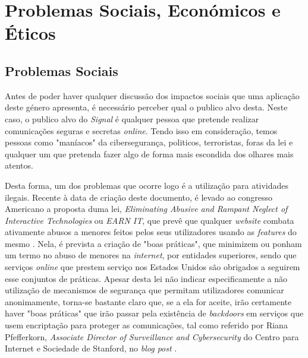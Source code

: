 \section{Problemas Sociais, Económicos e Éticos}

\subsection{Problemas Sociais}
Antes de poder haver qualquer discussão dos impactos sociais que uma aplicação deste género apresenta, é necessário perceber qual o publico alvo desta. Neste caso, o publico alvo do \textit{Signal} é qualquer pessoa que pretende realizar comunicações seguras e secretas \textit{online}. Tendo isso em consideração, temos pessoas como "maníacos" da cibersegurança, politicos, terroristas, foras da lei e qualquer um que pretenda fazer algo de forma mais escondida dos olhares mais atentos.

Desta forma, um dos problemas que ocorre logo é a utilização para atividades ilegais. Recente à data de criação deste documento, é levado ao congresso Americano a proposta duma lei, \textit{Eliminating Abusive and Rampant Neglect of Interactive Technologies} ou \textit{EARN IT}, que prevê que qualquer \textit{website} combata ativamente abusos a menores feitos pelos seus utilizadores usando as \textit{features} do mesmo \cite{senate_earn_it}. Nela, é prevista a criação de "boas práticas", que minimizem ou ponham um termo no abuso de menores na \textit{internet}, por entidades superiores, sendo que serviços \textit{online} que prestem serviço nos Estados Unidos são obrigados a seguirem esse conjuntos de práticas. Apesar desta lei não indicar especificamente a não utilização de mecanismos de segurança que permitam utilizadores comunicar anonimamente, torna-se bastante claro que, se a ela for aceite, irão certamente haver "boas práticas" que irão passar pela existência de \textit{backdoors} em serviços que usem encriptação para proteger as comunicações, tal como referido por Riana Pfefferkorn, \textit{Associate Director of Surveillance and Cybersecurity} do Centro para Internet e Sociedade de Stanford, no \textit{blog post} \cite{stanford_cis}.

